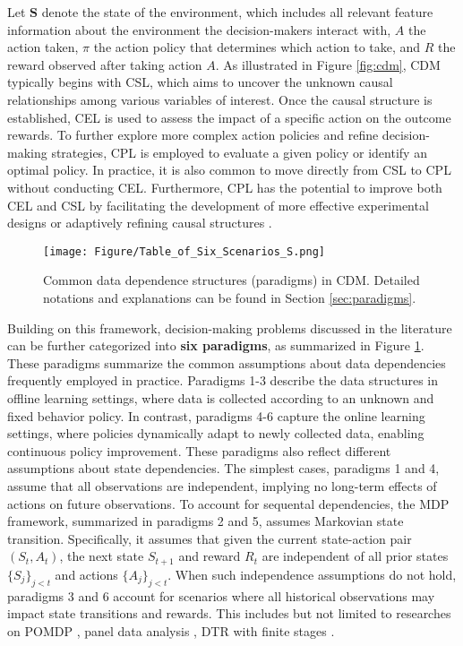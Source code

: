 Let $\boldsymbol{S}$ denote the state of the environment, which includes all relevant feature information about the environment the decision-makers interact with, $A$ the action taken, $\pi$ the action policy that determines which action to take, and $R$ the reward observed after taking action $A$. As illustrated in Figure \ref{fig:cdm}, \acrshort{CDM} typically begins with \acrshort{CSL}, which aims to uncover the unknown causal relationships among various variables of interest. Once the causal structure is established, \acrshort{CEL} is used to assess the impact of a specific action on the outcome rewards. To further explore more complex action policies and refine decision-making strategies, \acrshort{CPL} is employed to evaluate a given policy or identify an optimal policy. In practice, it is also common to move directly from \acrshort{CSL} to \acrshort{CPL} without conducting \acrshort{CEL}. Furthermore, \acrshort{CPL} has the potential to improve both \acrshort{CEL} and \acrshort{CSL} by facilitating the development of more effective experimental designs \citep{zhu2019causal,simchi2023multi} or adaptively refining causal structures \citep{sauter2024core}. %

\begin{figure}[!t]
    \centering
    \texttt{[image: Figure/Table\_of\_Six\_Scenarios\_S.png]}
    \caption{Common data dependence structures (paradigms) in \acrshort{CDM}. Detailed notations and explanations can be found in Section \ref{sec:paradigms}.}
    \label{Fig:paradigms}
\end{figure}
Building on this framework, decision-making problems discussed in the literature can be further categorized into \textbf{six paradigms}, as summarized in Figure \ref{Fig:paradigms}. These paradigms summarize the common assumptions about data dependencies frequently employed in practice. Paradigms 1-3 describe the data structures in offline learning settings, where data is collected according to an unknown and fixed behavior policy. In contrast, paradigms 4-6 capture the online learning settings, where policies dynamically adapt to newly collected data, enabling continuous policy improvement. These paradigms also reflect different assumptions about state dependencies. The simplest cases, paradigms 1 and 4, assume that all observations are independent, implying no long-term effects of actions on future observations. To account for sequental dependencies, the \acrfull{MDP} framework, summarized in paradigms 2 and 5, assumes Markovian state transition. Specifically, it assumes that given the current state-action pair $(S_t, A_t)$, the next state $S_{t+1}$ and reward $R_t$ are independent of all prior states $\{S_j\}_{j < t}$ and actions $\{A_j\}_{j < t}$. When such independence assumptions do not hold, paradigms 3 and 6 account for scenarios where all historical observations may impact state transitions and rewards. This includes but not limited to researches on \acrfull{POMDP} \citep{hausknecht2015deep, littman2009tutorial}, panel data analysis \citep{hsiao2007panel,hsiao2022analysis}, \acrfull{DTR} with finite stages \citep{chakraborty2014dynamic, chakraborty2013statistical}. 

